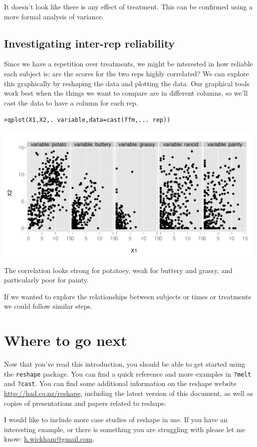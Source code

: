 \documentclass[oneside,letterpaper]{scrartcl}
\begin{document}
It doesn't look like there is any effect of treatment.  This can be confirmed using a more formal analysis of variance.

\subsection{Investigating inter-rep reliability}\label{sub:investigation_inter_rep_reliability}

Since we have a repetition over treatments, we might be interested in how reliable each subject is: are the scores for the two reps highly correlated?  We can explore this graphically by reshaping the data and plotting the data.  Our graphical tools work best when the things we want to compare are in different columns, so we'll cast the data to have a column for each rep.

\begin{alltt}
> qplot(X1, X2, . ~ variable, data = cast(ffm, ... ~ rep))
\end{alltt}
\includegraphics[scale=1]{./include/3416a75f4cea9109507cacd8e2f2aefc-001.pdf}
\begin{alltt}

\end{alltt}

The correlation looks strong for potatoey, weak for buttery and grassy, and particularly poor for painty.

If we wanted to explore the relationships between subjects or times or treatments we could follow similar steps.

\newpage
\section{Where to go next}

Now that you've read this introduction, you should be able to get started using the {\tt reshape} package.  You can find a quick reference and more examples in {\tt ?melt} and {\tt ?cast}.   You can find some additional information on the reshape website \url{http://had.co.nz/reshape}, including the latest version of this document, as well as  copies of presentations and papers related to reshape.  

I would like to include more case studies of reshape in use.  If you have an interesting example, or there is something you are struggling with please let me know: \href{mailto:h.wickham@gmail.com}{h.wickham@gmail.com}.
\end{document}
